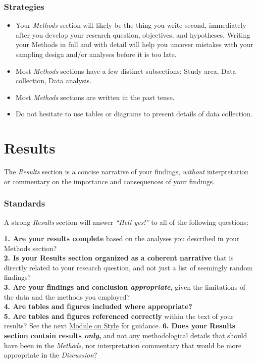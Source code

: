\documentclass[
]{book}
\begin{document}
\hypertarget{strategies-2}{%
\subsubsection*{Strategies}\label{strategies-2}}

\begin{itemize}
\item
  Your \emph{Methods} section will likely be the thing you write second, immediately after you develop your research question, objectives, and hypotheses. Writing your Methods in full and with detail will help you uncover mistakes with your sampling design and/or analyses before it is too late.
\item
  Most \emph{Methods} sections have a few distinct subsections: Study area, Data collection, Data analysis.
\item
  Most \emph{Methods} sections are written in the past tense.
\item
  Do not hesitate to use tables or diagrams to present details of data collection.
\end{itemize}

\hypertarget{results}{%
\section*{Results}\label{results}}

The \emph{Results} section is a concise narrative of your findings, \emph{without} interpretation or commentary on the importance and consequences of your findings.

\hypertarget{standards-3}{%
\subsubsection*{Standards}\label{standards-3}}

A strong \emph{Results} section will answer \emph{``Hell yes!''} to all of the following questions:

\textbf{1. Are your results complete} based on the analyses you described in your Methods section?\\
\textbf{2. Is your Results section organized as a coherent narrative} that is directly related to your research question, and not just a list of seemingly random findings?\\
\textbf{3. Are your findings and conclusion \emph{appropriate},} given the limitations of the data and the methods you employed?\\
\textbf{4. Are tables and figures included where appropriate?}\\
\textbf{5. Are tables and figures referenced correctly} within the text of your results? See the next \protect\hyperlink{style}{Module on Style} for guidance.
\textbf{6. Does your Results section contain results \emph{only},} and not any methodological details that should have been in the \emph{Methods}, nor interpretation commentary that would be more appropriate in the \emph{Discussion}?
\end{document}
